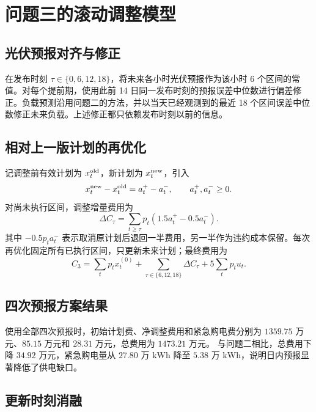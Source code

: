 \section{问题三的滚动调整模型}

\subsection{光伏预报对齐与修正}

在发布时刻 $\tau\in\{0,6,12,18\}$，将未来各小时光伏预报作为该小时 6 个区间的常值。对每个提前期，使用此前 14 日同一发布时刻的预报误差中位数进行偏差修正。负载预测沿用问题二的方法，并以当天已经观测到的最近 18 个区间误差中位数修正未来负载。上述修正都只依赖发布时刻以前的信息。

\subsection{相对上一版计划的再优化}

记调整前有效计划为 $x_t^{\rm old}$，新计划为 $x_t^{\rm new}$，引入
\begin{equation}
x_t^{\rm new}-x_t^{\rm old}=a_t^+-a_t^-,\qquad a_t^+,a_t^-\geq0.
\end{equation}
对尚未执行区间，调整增量费用为
\begin{equation}
\Delta C_{\tau}=\sum_{t\geq\tau}p_t\left(1.5a_t^+-0.5a_t^-\right).
\label{eq:adjust}
\end{equation}
其中 $-0.5p_ta_t^-$ 表示取消原计划后退回一半费用，另一半作为违约成本保留。每次再优化固定所有已执行区间，只更新未来计划；最终费用为
\begin{equation}
C_3=\sum_t p_tx_t^{(0)}+\sum_{\tau\in\{6,12,18\}}\Delta C_{\tau}
+5\sum_t p_tu_t.
\end{equation}

\subsection{四次预报方案结果}

使用全部四次预报时，初始计划费、净调整费用和紧急购电费分别为
$1359.75$ 万元、$85.15$ 万元和 $28.31$ 万元，总费用为 $1473.21$ 万元。
与问题二相比，总费用下降 $34.92$ 万元，紧急购电量从 $27.80$ 万
$\mathrm{kWh}$ 降至 $5.38$ 万 $\mathrm{kWh}$，说明日内预报显著降低了供电缺口。

\subsection{更新时刻消融}

